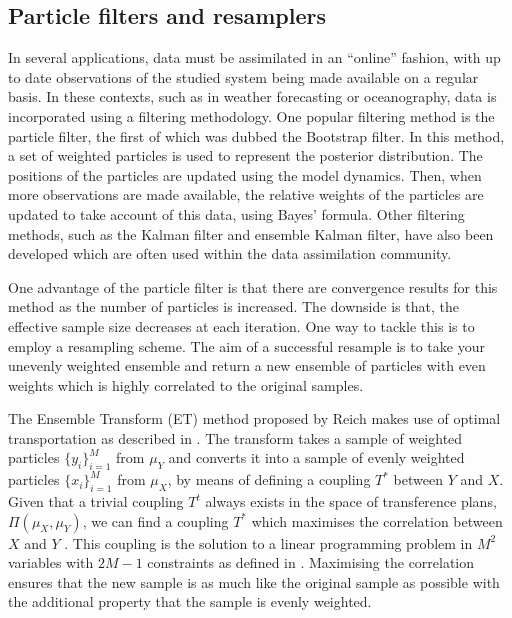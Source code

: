 \documentclass[final]{siamltex}
\begin{document}
\subsection{Particle filters and resamplers}\label{sec:filters}
In several applications, data must be assimilated in an ``online''
fashion, with up to date observations of the studied system being made
available on a regular basis. In these contexts, such as in weather forecasting or
oceanography, data is incorporated using a filtering
methodology. One popular filtering method is the particle filter, the
first of which was dubbed the Bootstrap
filter\cite{gordon1993novel}. In this method, a set of weighted particles is
used to represent the posterior distribution. The positions of the
particles are updated using the model dynamics. Then, when more
observations are made available, the relative weights of the particles
are updated to take account of this data, using Bayes' formula. Other filtering methods, such
as the Kalman filter\cite{kalman1960new} and ensemble Kalman filter\cite{evensen1994sequential}, have also been developed which are often used within the data
assimilation community.

One advantage of the particle filter is that there are convergence
results for this method as the number of particles is increased. The
downside is that, the effective sample size decreases at each iteration. One way to tackle
this is to employ a resampling scheme. The aim of a successful
resample is to take your unevenly weighted ensemble and return a new
ensemble of particles with even weights which is highly correlated to the original samples.

The Ensemble Transform (ET) method proposed by Reich \cite{reich2013nonparametric} makes use of optimal transportation as described in \cite{villani2003topics,villani2008optimal}. The transform takes a sample of weighted particles $\{y_i\}_{i=1}^M$ from $\mu_Y$ and converts it into a sample of evenly weighted particles $\{x_i\}_{i=1}^M$ from $\mu_X$, by means of defining a coupling $T^*$ between $Y$ and $X$. Given that a trivial coupling $T^t$ always exists in the space of transference plans, $\Pi(\mu_{X}, \mu_{Y})$, we can find a coupling $T^*$ which maximises the correlation between $X$ and $Y$ \cite{cotter2012ensemble}. This coupling is the solution to a linear programming problem in $M^2$ variables with $2M-1$ constraints as defined in \cite{reich2013nonparametric}. Maximising the correlation ensures that the new sample is as much like the original sample as possible with the additional property that the sample is evenly weighted.
\end{document}
